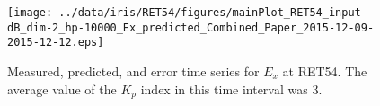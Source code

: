 \documentclass[12pt]{article}
\begin{document}
\clearpage
\begin{figure}[h]
\centering
\texttt{[image: ../data/iris/RET54/figures/mainPlot\_RET54\_input-dB\_dim-2\_hp-10000\_Ex\_predicted\_Combined\_Paper\_2015-12-09-2015-12-12.eps]}
\caption{Measured, predicted, and error time series for $E_x$ at RET54. The average value of the $K_p$ index in this time interval was 3.}
\label{figure:RET54}
\end{figure}
\end{document}
